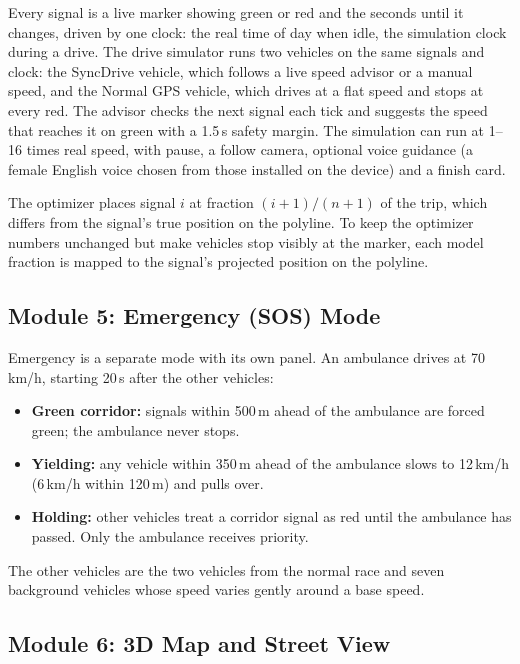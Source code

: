 \documentclass[12pt,a4paper]{report}
\begin{document}
Every signal is a live marker showing green or red and the seconds until it
changes, driven by one clock: the real time of day when idle, the simulation
clock during a drive. The drive simulator runs two vehicles on the same signals
and clock: the SyncDrive vehicle, which follows a live speed advisor or a
manual speed, and the Normal GPS vehicle, which drives at a flat speed and
stops at every red. The advisor checks the next signal each tick and suggests
the speed that reaches it on green with a 1.5\,s safety margin. The simulation
can run at 1--16 times real speed, with pause, a follow camera, optional voice
guidance (a female English voice chosen from those installed on the device) and
a finish card.

The optimizer places signal $i$ at fraction $(i+1)/(n+1)$ of the trip, which
differs from the signal's true position on the polyline. To keep the optimizer
numbers unchanged but make vehicles stop visibly at the marker, each model
fraction is mapped to the signal's projected position on the polyline.

\subsection{Module 5: Emergency (SOS) Mode}

Emergency is a separate mode with its own panel. An ambulance drives at
70\,km/h, starting 20\,s after the other vehicles:

\begin{itemize}
  \item \textbf{Green corridor:} signals within 500\,m ahead of the ambulance
        are forced green; the ambulance never stops.
  \item \textbf{Yielding:} any vehicle within 350\,m ahead of the ambulance
        slows to 12\,km/h (6\,km/h within 120\,m) and pulls over.
  \item \textbf{Holding:} other vehicles treat a corridor signal as red until
        the ambulance has passed. Only the ambulance receives priority.
\end{itemize}

The other vehicles are the two vehicles from the normal race and seven
background vehicles whose speed varies gently around a base speed.

\subsection{Module 6: 3D Map and Street View}
\end{document}
